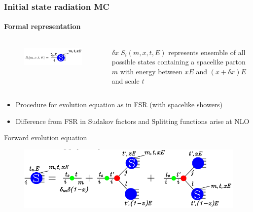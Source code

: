 \documentclass[aspectratio=43]{beamer}
\begin{document}
\begin{frame}
	
	\frametitle{Initial state radiation MC}
	\framesubtitle{Formal representation}
		
	\begin{columns}

	
		\begin{figure}
			\includegraphics[width = 4.5 cm]{plots/ISR_shower_1b.png}
		\end{figure}
	

			\footnotesize $\delta x \; S_{i}(m, x, t, E)$ represents ensemble of all possible states containing a spacelike parton $m$ with energy between $xE$ and $(x + \delta x)E$ and scale $t$
			
	\end{columns}

	\begin{itemize}
		\item \footnotesize Procedure for evolution equation as in FSR (with spacelike showers)
		\item \footnotesize Difference from FSR in Sudakov factors and Splitting functions arise at NLO
	\end{itemize}
	
	\footnotesize Forward evolution equation
	\begin{figure}
		\includegraphics[width = 8.5 cm]{plots/ISR_shower_2.png}
	\end{figure}

\end{frame}
\end{document}

